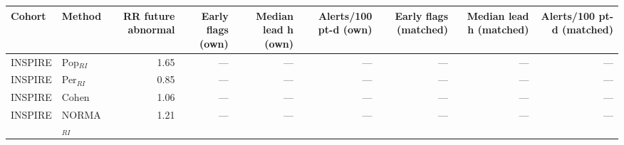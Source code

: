 \begin{table}[ht]
\centering
\scriptsize
\begin{tabular}{llrrrrrrr}
\toprule
Cohort & Method & RR future abnormal & Early flags (own) & Median lead h (own) & Alerts/100 pt-d (own) & Early flags (matched) & Median lead h (matched) & Alerts/100 pt-d (matched) \\
\midrule
INSPIRE & Pop$_{RI}$ & 1.65 & --- & --- & --- & --- & --- & --- \\
INSPIRE & Per$_{RI}$ & 0.85 & --- & --- & --- & --- & --- & --- \\
INSPIRE & Cohen & 1.06 & --- & --- & --- & --- & --- & --- \\
INSPIRE & NORMA$_{RI}$ & 1.21 & --- & --- & --- & --- & --- & --- \\
\bottomrule
\end{tabular}
\label{tab:11_lead_time}
\end{table}